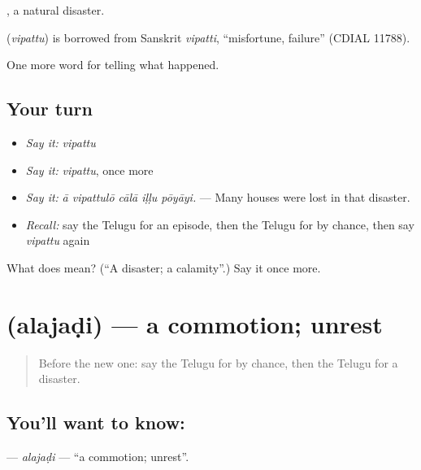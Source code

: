  , a natural disaster.

\begin{cousinweb}
\textbf{} (\emph{vipattu}) is borrowed from Sanskrit \emph{vipatti}, \textquotedblleft{}misfortune, failure\textquotedblright{} (CDIAL 11788).
\end{cousinweb}

\begin{grammarlens}[title={What you've built}]
One more word for telling what happened.
\end{grammarlens}

\subsection*{Your turn}
\begin{itemize}
\raggedright
  \item \emph{Say it:} \emph{vipattu}
  \item \emph{Say it:} \emph{vipattu}, once more
  \item \emph{Say it:} \emph{ā vipattulō cālā iḷḷu pōyāyi.} — Many houses were lost in that disaster.
  \item \emph{Recall:} say the Telugu for an episode, then the Telugu for by chance, then say \emph{vipattu} again
\end{itemize}

\begin{tcolorbox}[breakable,colback=teal!4,colframe=teal!35!black,title={Before you move on}]
What does  mean? (\textquotedblleft{}A disaster; a calamity\textquotedblright{}.) Say it once more.
\end{tcolorbox}
\section[\texorpdfstring{\te{అలజడి} (alajaḍi)}{అలజడి (alajaḍi)}]{ (alajaḍi) — a commotion; unrest}

\label{lesson:TE-C377-alajadi}



\begin{quote}
Before the new one: say the Telugu for by chance, then the Telugu for a disaster.
\end{quote}

\subsection*{You'll want to know: }
\textbf{} — \emph{alajaḍi} — \textquotedblleft{}a commotion; unrest\textquotedblright{}.

